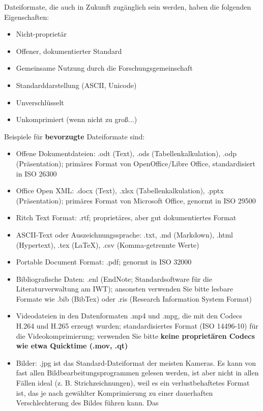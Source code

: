 Dateiformate, die auch in Zukunft zugänglich sein werden, haben die folgenden
Eigenschaften:
\begin{itemize}
  \item Nicht-proprietär
  \item Offener, dokumentierter Standard
  \item Gemeinsame Nutzung durch die Forschungsgemeinschaft
  \item Standarddarstellung (ASCII, Unicode)
  \item Unverschlüsselt
  \item Unkomprimiert (wenn nicht zu groß...)
\end{itemize}

\noindent Beispiele für \textbf{bevorzugte} Dateiformate sind:
\begin{itemize}
  \item Offene Dokumentdateien: .odt (Text), .ods (Tabellenkalkulation), .odp
        (Präsentation); primäres Format von OpenOffice/Libre Office,
        standardisiert in ISO 26300
  \item Office Open XML: .docx (Text), .xlsx (Tabellenkalkulation), .pptx
        (Präsentation); primäres Format von Microsoft Office, genormt in ISO 29500
  \item Ritch Text Format: .rtf; proprietäres, aber gut dokumentiertes Format
  \item ASCII-Text oder Auszeichnungssprache: .txt, .md (Markdown), .html
        (Hypertext), .tex (LaTeX), .csv (Komma-getrennte Werte)
  \item Portable Document Format: .pdf; genormt in ISO 32000
  \item Bibliografische Daten: .enl (EndNote; Standardsoftware für die
        Literaturverwaltung am IWT); ansonsten verwenden Sie bitte lesbare
        Formate wie .bib (BibTex) oder .ris (Research Information System Format)
  \item Videodateien in den Datenformaten .mp4 und .mpg, die mit den Codecs
        H.264 und H.265 erzeugt wurden; standardisiertes Format (ISO 14496-10)
        für die Videokomprimierung; verwenden Sie bitte \textbf{keine
        proprietären Codecs wie etwa Quicktime (.mov, .qt)}
  \item Bilder: .jpg ist das Standard-Dateiformat der meisten Kameras. Es kann
        von fast allen Bildbearbeitungsprogrammen gelesen werden, ist aber nicht
        in allen Fällen ideal (z. B. Strichzeichnungen), weil es ein
        verlustbehaftetes Format ist, das je nach gewählter Komprimierung zu
        einer dauerhaften Verschlechterung des Bildes führen kann. Das

\end{itemize}
